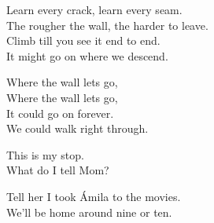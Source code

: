 \begin{lyrics}
Learn every crack, learn every seam.\\
The rougher the wall, the harder to leave.\\
Climb till you see it end to end.\\
It might go on where we descend.

Where the wall lets go,\\
Where the wall lets go,\\
It could go on forever.\\
We could walk right through.


This is my stop.\\
What do I tell Mom?

Tell her I took Ámila to the movies.\\
We’ll be home around nine or ten.
\end{lyrics}

